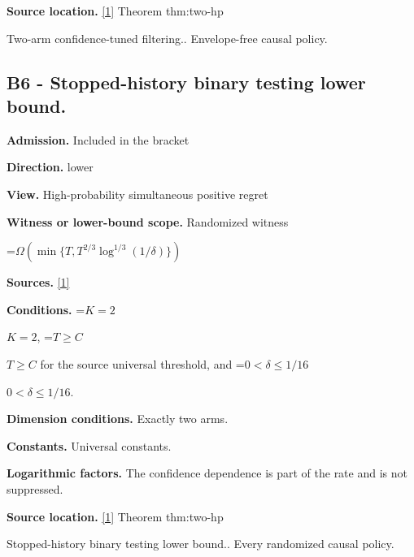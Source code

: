\documentclass[10pt,a4paper]{article}
\newcommand{\AtlasMath}[1]{\par\begingroup\centering\setbox0=\hbox{$\displaystyle #1$}\ifdim\wd0>1.4\linewidth\typeout{ATLAS WIDE FORMULA: \the\wd0}\fi\ifdim\wd0>\linewidth\resizebox{\linewidth}{!}{\box0}\else\box0\fi\par\endgroup}
\newcommand{\AtlasInlineMath}[1]{\begingroup\setbox0=\hbox{$#1$}\ifdim\wd0>.4\linewidth\endgroup\AtlasMath{#1}\else\endgroup$#1$\fi}
\begin{document}
\textbf{Source location.} \href{https://github.com/WU-Wendao/Colombo/blob/main/colombo_sensorium/Complexity_altas/data/sources/colombo/U07/manuscript.pdf}{[1]} Theorem thm:two-hp



Two-arm confidence-tuned filtering.. Envelope-free causal policy.



\subsection{B6 - Stopped-history binary testing lower bound.}


\textbf{Admission.} Included in the bracket



\textbf{Direction.} lower



\textbf{View.} High-probability simultaneous positive regret



\textbf{Witness or lower-bound scope.} Randomized witness



\AtlasMath{\Omega\!\left(\min\{T,T^{2/3}\log^{1/3}(1/\delta)\}\right)}


\textbf{Sources.} \href{https://github.com/WU-Wendao/Colombo/blob/main/colombo_sensorium/Complexity_altas/data/sources/colombo/U07/manuscript.pdf}{[1]}



\textbf{Conditions.} \AtlasInlineMath{K=2}, \AtlasInlineMath{T\ge C} for the source universal threshold, and \AtlasInlineMath{0<\delta\le1/16}.



\textbf{Dimension conditions.} Exactly two arms.



\textbf{Constants.} Universal constants.



\textbf{Logarithmic factors.} The confidence dependence is part of the rate and is not suppressed.



\textbf{Source location.} \href{https://github.com/WU-Wendao/Colombo/blob/main/colombo_sensorium/Complexity_altas/data/sources/colombo/U07/manuscript.pdf}{[1]} Theorem thm:two-hp



Stopped-history binary testing lower bound.. Every randomized causal policy.
\end{document}

